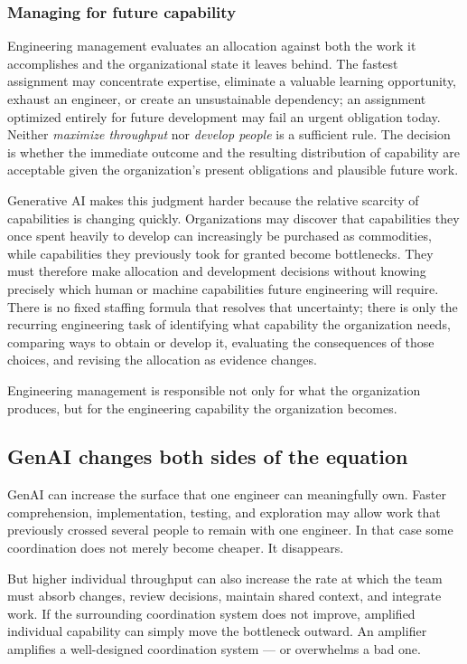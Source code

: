 \subsubsection{Managing for future capability}\label{sec-managing-future-capability}

Engineering management evaluates an allocation against both the work it accomplishes and the
organizational state it leaves behind. The fastest assignment may concentrate expertise, eliminate
a valuable learning opportunity, exhaust an engineer, or create an unsustainable dependency; an
assignment optimized entirely for future development may fail an urgent obligation today. Neither
\emph{maximize throughput} nor \emph{develop people} is a sufficient rule. The decision is whether the
immediate outcome and the resulting distribution of capability are acceptable given the
organization's present obligations and plausible future work.

Generative AI makes this judgment harder because the relative scarcity of capabilities is changing
quickly. Organizations may discover that capabilities they once spent heavily to develop can
increasingly be purchased as commodities, while capabilities they previously took for granted
become bottlenecks. They must therefore make allocation and development decisions without knowing
precisely which human or machine capabilities future engineering will require. There is no fixed
staffing formula that resolves that uncertainty; there is only the recurring engineering task of
identifying what capability the organization needs, comparing ways to obtain or develop it,
evaluating the consequences of those choices, and revising the allocation as evidence changes.

Engineering management is responsible not only for what the organization produces, but for the
engineering capability the organization becomes.

\subsection{GenAI changes both sides of the equation}\label{sec-genai-team}

GenAI can increase the surface that one engineer can meaningfully own. Faster comprehension,
implementation, testing, and exploration may allow work that previously crossed several people to
remain with one engineer. In that case some coordination does not merely become cheaper. It
disappears.

But higher individual throughput can also increase the rate at which the team must absorb changes,
review decisions, maintain shared context, and integrate work. If the surrounding coordination
system does not improve, amplified individual capability can simply move the bottleneck outward. An
amplifier amplifies a well-designed coordination system --- or overwhelms a bad one.


